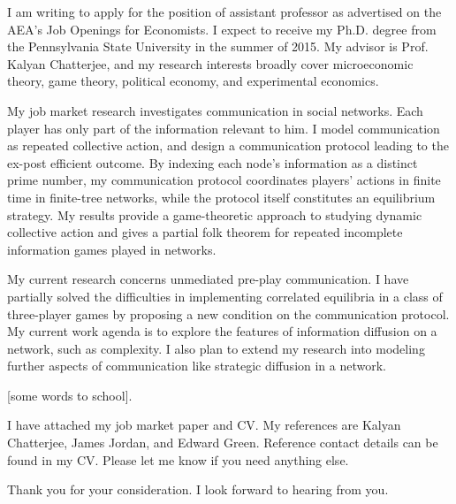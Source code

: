 \documentclass[12pt,stdletter,dateno,sigleft]{newlfm} %
\begin{document}
\begin{newlfm}


I am writing to apply for the position of assistant professor as advertised on the AEA's Job Openings for Economists. I expect to receive my Ph.D. degree from the Pennsylvania State University in the summer of 2015.  My advisor is Prof. Kalyan Chatterjee, and my research interests broadly cover microeconomic theory, game theory, political economy, and experimental economics.

My job market research investigates communication in social networks. Each player has only part of the information relevant to him. I model communication as repeated collective action, and design a communication protocol leading to the ex-post efficient outcome. By indexing each node's information as a distinct prime number, my communication protocol coordinates players' actions in finite time in finite-tree networks, while the protocol itself constitutes an equilibrium strategy. My results provide a game-theoretic approach to studying dynamic collective action and gives a partial folk theorem for repeated incomplete information games played in networks.

My current research concerns unmediated pre-play communication. I have partially solved the difficulties in implementing correlated equilibria in a class of three-player games by proposing a new condition on the communication protocol. My current work agenda is to explore the features of information diffusion on a network, such as complexity. I also plan to extend my research into modeling further aspects of communication like strategic diffusion in a network.

[some words to school].  

I have attached my job market paper and CV. My references are Kalyan Chatterjee, James Jordan, and Edward Green.  Reference contact details can be found in my CV.  Please let me know if you need anything else.

Thank you for your consideration.  I look forward to hearing from you.


\end{newlfm}
\end{document}
